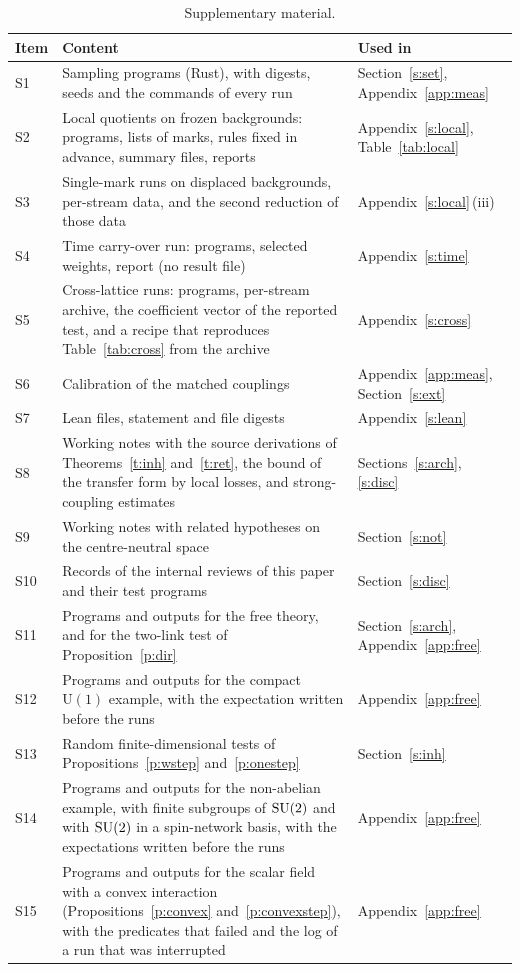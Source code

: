 \begin{table}[htbp]
\caption{Supplementary material.}\label{tab:supp}
\centering\small
\begin{tabular}{@{}l>{\raggedright\arraybackslash}p{}>{\raggedright\arraybackslash}p{}@{}}
\toprule
Item & Content & Used in \\
\midrule
S1 & Sampling programs (Rust), with digests, seeds and the commands of every run & Section~\ref{s:set}, Appendix~\ref{app:meas} \\
S2 & Local quotients on frozen backgrounds: programs, lists of marks, rules fixed in advance, summary files, reports & Appendix~\ref{s:local}, Table~\ref{tab:local} \\
S3 & Single-mark runs on displaced backgrounds, per-stream data, and the second reduction of those data & Appendix~\ref{s:local}\,(iii) \\
S4 & Time carry-over run: programs, selected weights, report (no result file) & Appendix~\ref{s:time} \\
S5 & Cross-lattice runs: programs, per-stream archive, the coefficient vector of the reported test, and a recipe that reproduces Table~\ref{tab:cross} from the archive & Appendix~\ref{s:cross} \\
S6 & Calibration of the matched couplings & Appendix~\ref{app:meas}, Section~\ref{s:ext} \\
S7 & Lean files, statement and file digests & Appendix~\ref{s:lean} \\
S8 & Working notes with the source derivations of Theorems~\ref{t:inh} and~\ref{t:ret}, the bound of the transfer form by local losses, and strong-coupling estimates & Sections~\ref{s:arch}, \ref{s:disc} \\
S9 & Working notes with related hypotheses on the centre-neutral space & Section~\ref{s:not} \\
S10 & Records of the internal reviews of this paper and their test programs & Section~\ref{s:disc} \\
S11 & Programs and outputs for the free theory, and for the two-link test of Proposition~\ref{p:dir} & Section~\ref{s:arch}, Appendix~\ref{app:free} \\
S12 & Programs and outputs for the compact $\mathrm U(1)$ example, with the expectation written before the runs & Appendix~\ref{app:free} \\
S13 & Random finite-dimensional tests of Propositions~\ref{p:wstep} and~\ref{p:onestep} & Section~\ref{s:inh} \\
S14 & Programs and outputs for the non-abelian example, with finite subgroups of $\mathrm{SU}(2)$ and with $\mathrm{SU}(2)$ in a spin-network basis, with the expectations written before the runs & Appendix~\ref{app:free} \\
S15 & Programs and outputs for the scalar field with a convex interaction (Propositions~\ref{p:convex} and~\ref{p:convexstep}), with the predicates that failed and the log of a run that was interrupted & Appendix~\ref{app:free} \\
\bottomrule
\end{tabular}
\end{table}

